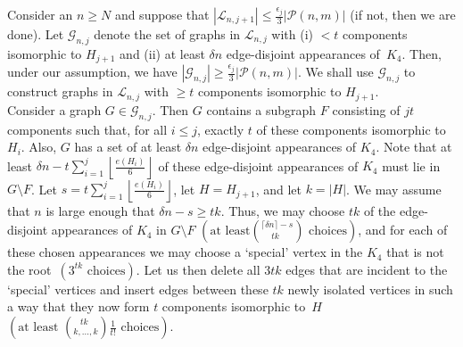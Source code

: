 \documentclass{article}
\newtheorem{Proof of Theorem}{Proof of Theorem}
\begin{document}
Consider an $n \geq N$ and suppose that 
$|\mathcal{L}_{n,j+1}| \leq \frac{\epsilon_{j}}{3} |\mathcal{P}(n,m)|$
(if not, then we are done).
Let $\mathcal{G}_{n,j}$ denote the set of graphs in $\mathcal{L}_{n,j}$ 
with (i) $<t$ components isomorphic to $H_{j+1}$ 
and (ii) at least $\delta n$ edge-disjoint appearances of~$K_{4}$.
Then, under our assumption,
we have $|\mathcal{G}_{n,j}| \geq \frac{\epsilon_{j}}{3} |\mathcal{P}(n,m)|$.
We shall use $\mathcal{G}_{n,j}$ to construct graphs in $\mathcal{L}_{n,j}$
with $\geq t$ components isomorphic to $H_{j+1}$. \\

Consider a graph $G \in \mathcal{G}_{n,j}$.
Then $G$ contains a subgraph $F$ consisting of $jt$ components such that,
for all $i \leq j$,
exactly $t$ of these components isomorphic to $H_{i}$.
Also, $G$ has a set of at least $\delta n$ edge-disjoint appearances of $K_{4}$.
Note that at least $\delta n - t \sum_{i=1}^{j} \left \lfloor \frac{e(H_{i})}{6} \right \rfloor$
of these edge-disjoint appearances of $K_{4}$ must lie in $G \setminus F$.
Let $s= t \sum_{i=1}^{j} \left \lfloor \frac{e(H_{i})}{6} \right \rfloor$,
let $H=H_{j+1}$,
and let $k=|H|$.
We may assume that $n$ is large enough that $\delta n - s \geq tk$.
Thus, we may choose $tk$ of the edge-disjoint appearances of $K_{4}$ in $G \setminus F$
$\left( \textrm{at least} \left( ^{\lceil \delta n \rceil -s} _{\phantom{wq}tk} \right) \textrm{ choices} \right)$,
and for each of these chosen appearances we may choose a `special' vertex in the $K_{4}$ that is not the 
root~$\left( 3^{tk} \textrm{ choices} \right)$.
Let us then delete all $3tk$ edges that are incident to the `special' vertices and 
insert edges between these $tk$ newly isolated vertices in such a way that they now form $t$ components
isomorphic to~$H$ 
$\left( \textrm{at least } \left( ^{\phantom{qi}tk} _{k, \ldots, k} \right) \frac{1}{t!} \textrm{ choices} \right)$.
\end{document}
